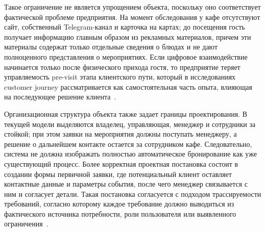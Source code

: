 Такое ограничение не является упрощением объекта, поскольку оно соответствует фактической проблеме предприятия. На момент обследования у кафе отсутствуют сайт, собственный Telegram-канал и карточка на картах; до посещения гость получает информацию главным образом из рекламных материалов, причем эти материалы содержат только отдельные сведения о блюдах и не дают полноценного представления о мероприятиях. Если цифровое взаимодействие начинается только после физического прихода гостя, то предприятие теряет управляемость pre-visit этапа клиентского пути, который в исследованиях customer journey рассматривается как самостоятельная часть опыта, влияющая на последующее решение клиента~\cite{pantouvakis2022,rita2022,stickdorn2018}.

Организационная структура объекта также задает границы проектирования. В текущей модели выделяются владелец, управляющая, менеджер и сотрудники за стойкой; при этом заявки на мероприятия должны поступать менеджеру, а решение о дальнейшем контакте остается за сотрудником кафе. Следовательно, система не должна изображать полностью автоматическое бронирование как уже существующий процесс. Более корректная проектная постановка состоит в создании формы первичной заявки, где потенциальный клиент оставляет контактные данные и параметры события, после чего менеджер связывается с ним и согласует детали. Такая постановка согласуется с подходом трассируемости требований, согласно которому каждое требование должно выводиться из фактического источника потребности, роли пользователя или выявленного ограничения~\cite{mucha2024}.

